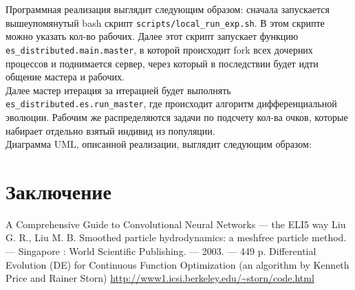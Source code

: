 \documentclass[12pt]{article}
\begin{document}
    Программная реализация выглядит следующим образом: сначала запускается вышеупомянутый bash скрипт \verb!scripts/local_run_exp.sh!. В этом скрипте можно указать кол-во рабочих. Далее этот скрипт запускает функцию \verb!es_distributed.main.master!, в которой происходит fork всех дочерних процессов и поднимается сервер, через который в последствии будет идти общение мастера и рабочих. \\

    Далее мастер итерация за итерацией будет выполнять \verb!es_distributed.es.run_master!, где происходит алгоритм дифференциальной эволюции. Рабочим же распределяются задачи по подсчету кол-ва очков, которые набирает отдельно взятый индивид из популяции. \\

    Диаграмма UML, описанной реализации, выглядит следующим образом:
    
    



\section{Заключение}

\newpage
{}
\begin{thebibliography}{}
    A Comprehensive Guide to Convolutional Neural Networks — the ELI5 way
    Liu G. R., Liu M. B. Smoothed particle hydrodynamics: a meshfree particle method. --- Singapore : World Scientific Publishing. --- 2003. --- 449 p.
    Differential Evolution (DE) for Continuous Function Optimization (an algorithm by Kenneth Price and Rainer Storn)
    \url{http://www1.icsi.berkeley.edu/~storn/code.html}

\end{thebibliography}
\end{document}
